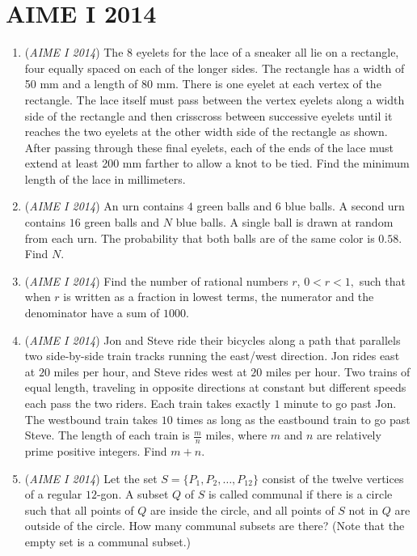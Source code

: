 \section{AIME I 2014}
        \begin{enumerate}
        	\item (\textit{AIME I 2014}) The 8 eyelets for the lace of a sneaker all lie on a rectangle, four equally spaced on each of the longer sides. The rectangle has a width of 50 mm and a length of 80 mm. There is one eyelet at each vertex of the rectangle. The lace itself must pass between the vertex eyelets along a width side of the rectangle and then crisscross between successive eyelets until it reaches the two eyelets at the other width side of the rectangle as shown. After passing through these final eyelets, each of the ends of the lace must extend at least 200 mm farther to allow a knot to be tied. Find the minimum length of the lace in millimeters. 


 

	\item (\textit{AIME I 2014}) An urn contains $4$ green balls and $6$ blue balls. A second urn contains $16$ green balls and $N$ blue balls. A single ball is drawn at random from each urn. The probability that both balls are of the same color is $0.58$. Find $N$.


 

	\item (\textit{AIME I 2014}) Find the number of rational numbers $r$, $0<r<1,$ such that when $r$ is written as a fraction in lowest terms, the numerator and the denominator have a sum of $1000$.


 

	\item (\textit{AIME I 2014}) Jon and Steve ride their bicycles along a path that parallels two side-by-side train tracks running the east/west direction. Jon rides east at $20$ miles per hour, and Steve rides west at $20$ miles per hour. Two trains of equal length, traveling in opposite directions at constant but different speeds each pass the two riders. Each train takes exactly $1$ minute to go past Jon. The westbound train takes $10$ times as long as the eastbound train to go past Steve. The length of each train is $\frac{m}{n}$ miles, where $m$ and $n$ are relatively prime positive integers. Find $m+n$.


 

	\item (\textit{AIME I 2014}) Let the set $S = \{P_1, P_2, \dots, P_{12}\}$ consist of the twelve vertices of a regular $12$-gon. A subset $Q$ of $S$ is called communal if there is a circle such that all points of $Q$ are inside the circle, and all points of $S$ not in $Q$ are outside of the circle. How many communal subsets are there? (Note that the empty set is a communal subset.)



\end{enumerate}
